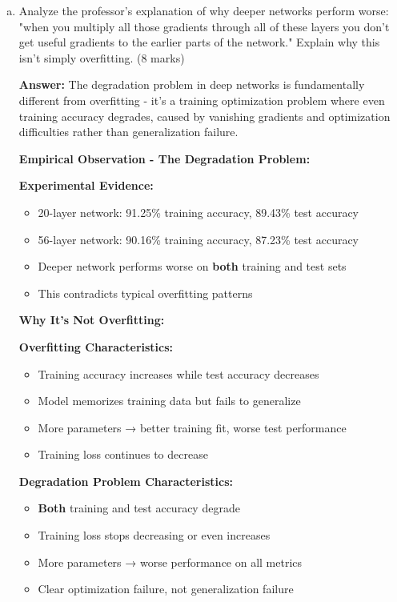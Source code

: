 \documentclass[12pt]{article}
\newcommand{\answer}[1]{{\color{answercolor}\textbf{Answer:} #1}}
\newcommand{\explanation}[1]{{\color{explanationcolor}#1}}
\begin{document}
\begin{enumerate}[(a)]
    \item Analyze the professor's explanation of why deeper networks perform worse: "when you multiply all those gradients through all of these layers you don't get useful gradients to the earlier parts of the network." Explain why this isn't simply overfitting. \hfill (8 marks)
    
    \answer{The degradation problem in deep networks is fundamentally different from overfitting - it's a training optimization problem where even training accuracy degrades, caused by vanishing gradients and optimization difficulties rather than generalization failure.}
    
    \explanation{
    \textbf{Empirical Observation - The Degradation Problem:}
    
    \textbf{Experimental Evidence:}
    \begin{itemize}
        \item 20-layer network: 91.25\% training accuracy, 89.43\% test accuracy
        \item 56-layer network: 90.16\% training accuracy, 87.23\% test accuracy
        \item Deeper network performs worse on \textbf{both} training and test sets
        \item This contradicts typical overfitting patterns
    \end{itemize}
    
    \textbf{Why It's Not Overfitting:}
    
    \textbf{Overfitting Characteristics:}
    \begin{itemize}
        \item Training accuracy increases while test accuracy decreases
        \item Model memorizes training data but fails to generalize
        \item More parameters → better training fit, worse test performance
        \item Training loss continues to decrease
    \end{itemize}
    
    \textbf{Degradation Problem Characteristics:}
    \begin{itemize}
        \item \textbf{Both} training and test accuracy degrade
        \item Training loss stops decreasing or even increases
        \item More parameters → worse performance on all metrics
        \item Clear optimization failure, not generalization failure
    \end{itemize}
    
}
\end{enumerate}
\end{document}
